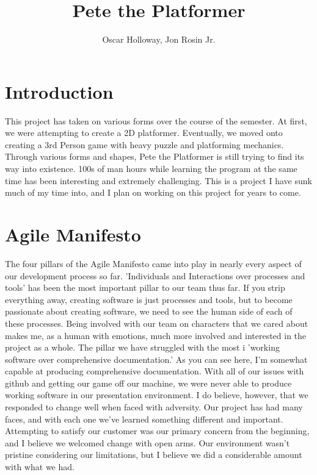 \documentclass[]{article}
\begin{document}

\title{Pete the Platformer}
\author{Oscar Holloway, Jon Rosin Jr.}
\maketitle


\tableofcontents


\section{Introduction}
	This project has taken on various forms over the course of the semester. At first, we were attempting to create a 2D platformer. Eventually, we moved onto creating a 3rd Person game with heavy puzzle and platforming mechanics. Through various forms and shapes, Pete the Platformer is still trying to find its way into existence. 100s of man hours while learning the program at the same time has been interesting and extremely challenging. This is a project I have sunk much of my time into, and I plan on working on this project for years to come. 

\section{Agile Manifesto}
	The four pillars of the Agile Manifesto came into play in nearly every aspect of our development process so far. 'Individuals and Interactions over processes and tools' has been the most important pillar to our team thus far. If you strip everything away, creating software is just processes and tools, but to become passionate about creating software, we need to see the human side of each of these processes. Being involved with our team on characters that we cared about makes me, as a human with emotions, much more involved and interested in the project as a whole.  The pillar we have struggled with the most i 'working software over comprehensive documentation.' As you can see here, I'm somewhat capable at producing comprehensive documentation. With all of our issues with github and getting our game off our machine, we were never able to produce working software in our presentation environment. I do believe, however, that we responded to change well when faced with adversity. Our project has had many faces, and with each one we've learned something different and important. Attempting to satisfy our customer was our primary concern from the beginning, and I believe we welcomed change with open arms. Our environment wasn't pristine considering our limitations, but I believe we did a considerable amount with what we had. 
	
\end{document}
